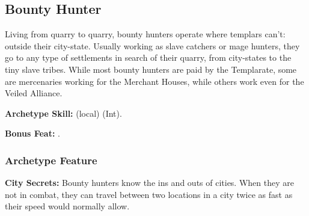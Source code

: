 \subsection{Bounty Hunter}
Living from quarry to quarry, bounty hunters operate where templars can't: outside their city-state. Usually working as slave catchers or mage hunters, they go to any type of settlements in search of their quarry, from city-states to the tiny slave tribes. While most bounty hunters are paid by the Templarate, some are mercenaries working for the Merchant Houses, while others work even for the Veiled Alliance.

\textbf{Archetype Skill:}  (local) (Int).

\textbf{Bonus Feat:} .

\subsubsection{Archetype Feature}
\textbf{City Secrets:} Bounty hunters know the ins and outs of cities. When they are not in combat, they can travel between two locations in a city twice as fast as their speed would normally allow.
